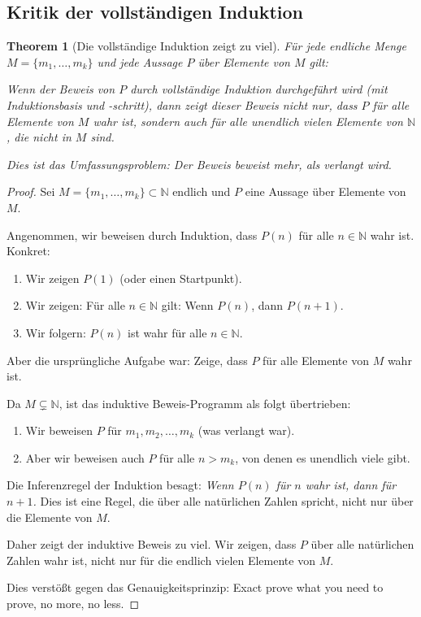 \documentclass[12pt, a4paper]{article}
\newtheorem{theorem}{Theorem}[section]
\theoremstyle{definition}
\theoremstyle{remark}
\newcommand{\N}{\mathbb{N}}
\begin{document}
\subsection{Kritik der vollständigen Induktion}
\label{subsec:kritik_induktion}

\begin{theorem}[Die vollständige Induktion zeigt zu viel]
\label{thm:induktion_zu_viel}
Für jede endliche Menge $M = \{m_1, \ldots, m_k\}$ und jede Aussage $P$ über Elemente von $M$ gilt:

Wenn der Beweis von $P$ durch vollständige Induktion durchgeführt wird (mit Induktionsbasis und -schritt), dann zeigt dieser Beweis nicht nur, dass $P$ für alle Elemente von $M$ wahr ist, sondern auch für alle unendlich vielen Elemente von $\N$, die nicht in $M$ sind.

Dies ist das \emph{Umfassungsproblem}: Der Beweis beweist mehr, als verlangt wird.
\end{theorem}

\begin{proof}
Sei $M = \{m_1, \ldots, m_k\} \subset \N$ endlich und $P$ eine Aussage über Elemente von $M$.

Angenommen, wir beweisen durch Induktion, dass $P(n)$ für alle $n \in \N$ wahr ist. Konkret:
\begin{enumerate}[label=(\roman*)]
  \item Wir zeigen $P(1)$ (oder einen Startpunkt).
  \item Wir zeigen: Für alle $n \in \N$ gilt: Wenn $P(n)$, dann $P(n+1)$.
  \item Wir folgern: $P(n)$ ist wahr für alle $n \in \N$.
\end{enumerate}

Aber die ursprüngliche Aufgabe war: Zeige, dass $P$ für alle Elemente von $M$ wahr ist.

Da $M \subsetneq \N$, ist das induktive Beweis-Programm als folgt übertrieben:
\begin{enumerate}[label=(\alph*)]
  \item Wir beweisen $P$ für $m_1, m_2, \ldots, m_k$ (was verlangt war).
  \item Aber wir beweisen auch $P$ für alle $n > m_k$, von denen es unendlich viele gibt.
\end{enumerate}

Die Inferenzregel der Induktion besagt: \textit{Wenn $P(n)$ für $n$ wahr ist, dann für $n+1$.} Dies ist eine Regel, die über alle natürlichen Zahlen spricht, nicht nur über die Elemente von $M$.

Daher zeigt der induktive Beweis zu viel. Wir zeigen, dass $P$ über alle natürlichen Zahlen wahr ist, nicht nur für die endlich vielen Elemente von $M$.

Dies verstößt gegen das Genauigkeitsprinzip: Exact prove what you need to prove, no more, no less.
\end{proof}
\end{document}
